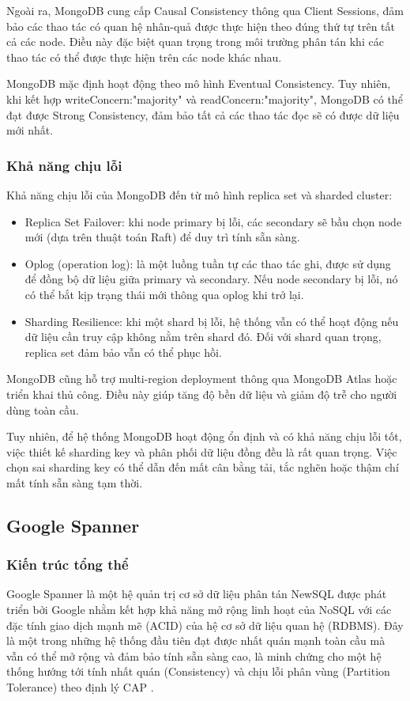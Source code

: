 \documentclass[conference]{IEEEtran}
\begin{document}
Ngoài ra, MongoDB cung cấp Causal Consistency thông qua Client Sessions, đảm bảo các thao tác có quan hệ nhân-quả được thực hiện theo đúng thứ tự trên tất cả các node. Điều này đặc biệt quan trọng trong môi trường phân tán khi các thao tác có thể được thực hiện trên các node khác nhau. 

MongoDB mặc định hoạt động theo mô hình Eventual Consistency. Tuy nhiên, khi kết hợp writeConcern:"majority" và readConcern:"majority", MongoDB có thể đạt được Strong Consistency, đảm bảo tất cả các thao tác đọc sẽ có được dữ liệu mới nhất.
\subsubsection{Khả năng chịu lỗi}
Khả năng chịu lỗi của MongoDB đến từ mô hình replica set và sharded cluster:
\begin{itemize}
    \item Replica Set Failover: khi node primary bị lỗi, các secondary sẽ bầu chọn node mới (dựa trên thuật toán Raft) để duy trì tính sẵn sàng.
    \item Oplog (operation log): là một luồng tuần tự các thao tác ghi, được sử dụng để đồng bộ dữ liệu giữa primary và secondary. Nếu node secondary bị lỗi, nó có thể bắt kịp trạng thái mới thông qua oplog khi trở lại.
    \item Sharding Resilience: khi một shard bị lỗi, hệ thống vẫn có thể hoạt động nếu dữ liệu cần truy cập không nằm trên shard đó. Đối với shard quan trọng, replica set đảm bảo vẫn có thể phục hồi.\cite{mongodbtrans}
\end{itemize}
MongoDB cũng hỗ trợ multi-region deployment thông qua MongoDB Atlas hoặc triển khai thủ công. Điều này giúp tăng độ bền dữ liệu và giảm độ trễ cho người dùng toàn cầu.

Tuy nhiên, để hệ thống MongoDB hoạt động ổn định và có khả năng chịu lỗi tốt, việc thiết kế sharding key và phân phối dữ liệu đồng đều là rất quan trọng. Việc chọn sai sharding key có thể dẫn đến mất cân bằng tải, tắc nghẽn hoặc thậm chí mất tính sẵn sàng tạm thời.
\subsection{Google Spanner}
\subsubsection{Kiến trúc tổng thể}
Google Spanner là một hệ quản trị cơ sở dữ liệu phân tán NewSQL được phát triển bởi Google nhằm kết hợp khả năng mở rộng linh hoạt của NoSQL với các đặc tính giao dịch mạnh mẽ (ACID) của hệ cơ sở dữ liệu quan hệ (RDBMS). Đây là một trong những hệ thống đầu tiên đạt được nhất quán mạnh toàn cầu mà vẫn có thể mở rộng và đảm bảo tính sẵn sàng cao, là minh chứng cho một hệ thống hướng tới tính nhất quán (Consistency) và chịu lỗi phân vùng (Partition Tolerance) theo định lý CAP \cite{gcp}.
\end{document}
